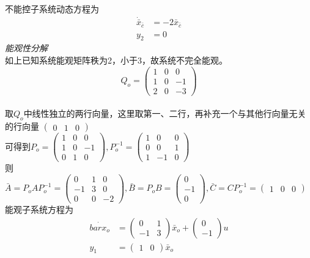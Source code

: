 \documentclass[a4paper]{article}
\begin{document}
不能控子系统动态方程为
\begin{align*}
\dot{\bar{x}}_{\bar{c}} &= -2\bar{x}_{\bar{c}} \\
y_{2} &= 0
\end{align*}
\emph{能观性分解}\\
如上已知系统能观矩阵秩为2，小于3，故系统不完全能观。\\
$$ Q_{o}= \left(\begin{array}{ccc} 1 & 0 & 0\\ 1 & 0 & -1\\ 2 & 0 & -3 \end{array}\right)$$ \\
取$Q_{o}$中线性独立的两行向量，这里取第一、二行，再补充一个与其他行向量无关的行向量 $\left(\begin{array}{ccc} 0 & 1 & 0 \end{array}\right)$ \\
可得到$ P_{o}= \left(\begin{array}{ccc} 1 & 0 & 0\\ 1 & 0 & -1\\ 0 & 1 & 0 \end{array}\right), P_{o}^{-1}=\left(\begin{array}{ccc} 1 & 0 & 0\\ 0 & 0 & 1\\ 1 & -1 & 0 \end{array}\right)$ \\
则$ \bar{A}=P_{o}AP_{o}^{-1}= \left(\begin{array}{ccc} 0 & 1 & 0\\ -1 & 3 & 0\\ 0 & 0 & -2 \end{array}\right),
\bar{B}=P_{o}B= \left(\begin{array}{c} 0\\ -1\\ 0 \end{array}\right),
\bar{C}=CP_{o}^{-1}= \left(\begin{array}{ccc} 1 & 0 & 0 \end{array}\right)$ \\
能观子系统方程为\\
\begin{align*}
\dot{bar{x}_{o}} &= \left(\begin{array}{cc} 0 & 1\\ -1 & 3 \end{array}\right)\bar{x}_{o}+\left(\begin{array}{c} 0\\ -1 \end{array}\right)u \\
y_1 &= \left(\begin{array}{cc} 1 & 0 \end{array}\right)\bar{x}_o
\end{align*}
\end{document}
